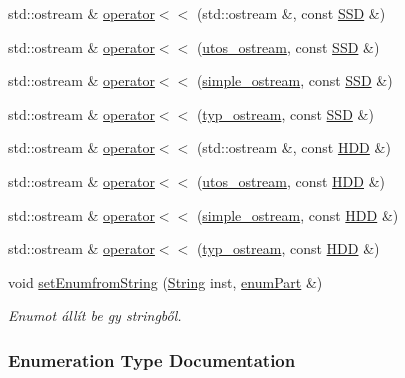 \begin{DoxyCompactItemize}
\item 
std\+::ostream \& \mbox{\hyperlink{_parts_8h_a58786e0f5831ee1afe7272e37221a12a}{operator$<$$<$}} (std\+::ostream \&, const \mbox{\hyperlink{class_s_s_d}{S\+SD}} \&)
\item 
std\+::ostream \& \mbox{\hyperlink{_parts_8h_aa671da3e5a8c60889bcb6ce6367758fc}{operator$<$$<$}} (\mbox{\hyperlink{structutos__ostream}{utos\+\_\+ostream}}, const \mbox{\hyperlink{class_s_s_d}{S\+SD}} \&)
\item 
std\+::ostream \& \mbox{\hyperlink{_parts_8h_ac34aed2e9316e6ad9415a38a456ddba7}{operator$<$$<$}} (\mbox{\hyperlink{structsimple__ostream}{simple\+\_\+ostream}}, const \mbox{\hyperlink{class_s_s_d}{S\+SD}} \&)
\item 
std\+::ostream \& \mbox{\hyperlink{_parts_8h_a8ca069cbd672d1e72d509dd2ba41a7ae}{operator$<$$<$}} (\mbox{\hyperlink{structtyp__ostream}{typ\+\_\+ostream}}, const \mbox{\hyperlink{class_s_s_d}{S\+SD}} \&)
\item 
std\+::ostream \& \mbox{\hyperlink{_parts_8h_aa60040b0f441945779699ec9ef31d0e5}{operator$<$$<$}} (std\+::ostream \&, const \mbox{\hyperlink{class_h_d_d}{H\+DD}} \&)
\item 
std\+::ostream \& \mbox{\hyperlink{_parts_8h_a3cd50fc84d17bbd6f412f72c5b5cbbfc}{operator$<$$<$}} (\mbox{\hyperlink{structutos__ostream}{utos\+\_\+ostream}}, const \mbox{\hyperlink{class_h_d_d}{H\+DD}} \&)
\item 
std\+::ostream \& \mbox{\hyperlink{_parts_8h_a5c884946a9b94523db0b1a696a4926f1}{operator$<$$<$}} (\mbox{\hyperlink{structsimple__ostream}{simple\+\_\+ostream}}, const \mbox{\hyperlink{class_h_d_d}{H\+DD}} \&)
\item 
std\+::ostream \& \mbox{\hyperlink{_parts_8h_a511b4bb17c53709bf87fc0209ddbda19}{operator$<$$<$}} (\mbox{\hyperlink{structtyp__ostream}{typ\+\_\+ostream}}, const \mbox{\hyperlink{class_h_d_d}{H\+DD}} \&)
\item 
void \mbox{\hyperlink{_parts_8h_a9927d3947b198137b12b944089e9a65c}{set\+Enumfrom\+String}} (\mbox{\hyperlink{class_string}{String}} inst, \mbox{\hyperlink{_parts_8h_abddff37837f171d72a2e16a1448a3943}{enum\+Part}} \&)
\begin{DoxyCompactList}\small\item\em Enumot állít be gy stringből. \end{DoxyCompactList}\end{DoxyCompactItemize}


\subsubsection{Enumeration Type Documentation}
\mbox{\label{_parts_8h_abddff37837f171d72a2e16a1448a3943}} 
